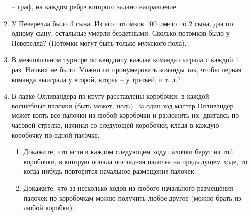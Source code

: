 \begin{enumerate}
 -- граф, на каждом ребре которого задано направление.
\item У Певерелла было 3 сына. Из его потомков 100 имело по 2 сына, два по одному сыну, остальные
умерли бездетными. Сколько потомков было у Певерелла? (Потомки могут быть только мужского пола).
\item В межшкольном турнире по квиддичу каждая команда сыграла с каждой 1 раз. Ничьих не было.
Можно ли пронумеровать команды так, чтобы первая команда выиграла у второй, вторая -- у третьей, и т.
д.?
\item В лавке Олливандера по кругу расставлены коробочки, в каждой -- волшебные палочки (быть
может, ноль). За один ход мастер Олливандер может взять все палочки из любой коробочки и разложить
их, двигаясь по часовой стрелке, начиная со следующей коробочки, кладя в каждую коробочку по одной
палочке.
\begin{enumerate}[noitemsep]
\item Докажите, что если в каждом следующем ходу палочки берут из той коробочки, в которую попала
последняя палочка на предыдущем ходе, то когда-нибудь повторится начальное размещение палочек.
\item Докажите, что за несколько ходов из любого начального размещения палочек по коробочкам можно
получить любое другое (можно брать из любой коробки).
\end{enumerate}
\end{enumerate}
